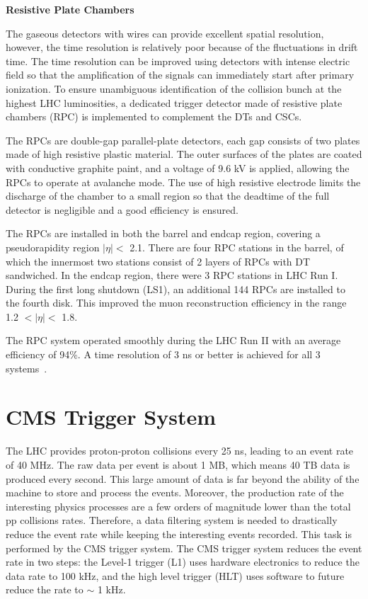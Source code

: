 \documentclass[thesis.tex]{subfiles}
\begin{document}
\noindent \textbf{Resistive Plate Chambers}

The gaseous detectors with wires can provide excellent spatial resolution, however, the time resolution is relatively poor because of the fluctuations in drift time. 
The time resolution can be improved using detectors with intense electric field so that the amplification of the signals can immediately start after primary ionization. 
To ensure unambiguous identification of the collision bunch at the highest LHC luminosities, a dedicated trigger detector made of resistive plate chambers (RPC) is implemented to complement the DTs and CSCs.

The RPCs are double-gap parallel-plate detectors, each gap consists of two plates made of high resistive plastic material. 
The outer surfaces of the plates are coated with conductive graphite paint, and a voltage of 9.6 kV is applied, allowing the RPCs to operate at avalanche mode.
The use of high resistive electrode limits the discharge of the chamber to a small region so that the deadtime of the full detector is negligible and a good efficiency is ensured.

The RPCs are installed in both the barrel and endcap region, covering a pseudorapidity region $|\eta| <$ 2.1.
There are four RPC stations in the barrel, of which the innermost two stations consist of 2 layers of RPCs with DT sandwiched. 
In the endcap region, there were 3 RPC stations in LHC Run I. 
During the first long shutdown (LS1), an additional 144 RPCs are installed to the fourth disk. This improved the muon reconstruction efficiency in the range 1.2 $< |\eta| < $ 1.8. 

The RPC system operated smoothly during the LHC Run II with an average efficiency of 94\%. 
A time resolution of 3 ns or better is achieved for all 3 systems~\cite{MuonPerform7TeV,MuonPerform13TeV}.


\section{CMS Trigger System}
The LHC provides proton-proton collisions every 25 ns, leading to an event rate of 40 MHz. 
The raw data per event is about 1 MB, which means 40 TB data is produced every second.  
This large amount of data is far beyond the ability of the machine to store and process the events. 
Moreover, the production rate of the interesting physics processes are a few orders of magnitude lower than the total pp collisions rates. 
Therefore, a data filtering system is needed to drastically reduce the event rate while keeping the interesting events recorded. 
This task is performed by the CMS trigger system.
The CMS trigger system reduces the event rate in two steps: the Level-1 trigger (L1) uses hardware electronics to reduce the data rate to 100 kHz, and the high level trigger (HLT) uses software to future reduce the rate to $\sim$ 1 kHz.\\
\end{document}
